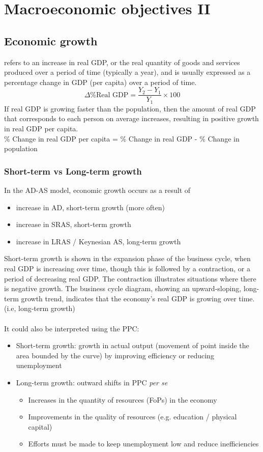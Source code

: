 \section{Macroeconomic objectives II}
\subsection{Economic growth}
 refers to an increase in real GDP, or the real quantity of goods and services produced over a period of time (typically a year), and is usually expressed as a percentage change in GDP (per capita) over a period of time.
\[\Delta \%\text{Real GDP}=\dfrac{Y_2-Y_1}{Y_1}\times 100\]
If real GDP is growing faster than the population, then the amount of real GDP that corresponds to each person on average increases, resulting in positive growth in real GDP per capita.\\
\% Change in real GDP per capita = \% Change in real GDP - \% Change in population
\subsubsection*{Short-term vs Long-term growth}
In the AD-AS model, economic growth occurs as a result of
\begin{itemize}
  \item increase in AD, short-term growth (more often)
  \item increase in SRAS, short-term growth
  \item increase in LRAS / Keynesian AS, long-term growth
\end{itemize}
Short-term growth is shown in the expansion phase of the business cycle, when real GDP is increasing over time, though this is followed by a contraction, or a period of decreasing real GDP. The contraction illustrates situations where there is negative growth. 
The business cycle diagram, showing an upward-sloping, long-term growth trend, indicates that the economy's real GDP is growing over time. (i.e, long-term growth)\\\\
It could also be interpreted using the PPC: 
\begin{itemize}
  \item Short-term growth: growth in actual output (movement of point inside the area bounded by the curve) by improving efficiency or reducing unemployment
  \item Long-term growth: outward shifts in PPC \emph{per se}
  \begin{itemize}
    \item Increases in the quantity of resources (FoPs) in the economy
    \item Improvements in the quality of resources (e.g. education / physical capital)
    \item Efforts must be made to keep unemployment low and reduce inefficiencies
  \end{itemize} 
\end{itemize}
